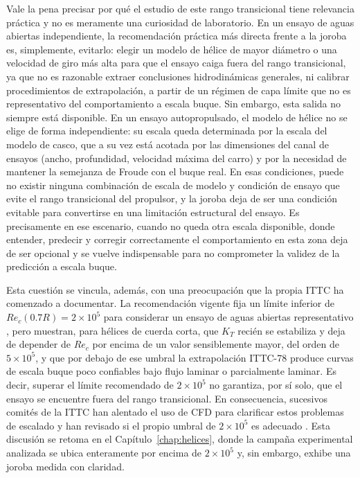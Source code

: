 Vale la pena precisar por qué el estudio de este rango transicional tiene relevancia
práctica y no es meramente una curiosidad de laboratorio. En un ensayo de aguas
abiertas independiente, la recomendación práctica más directa frente a la joroba es,
simplemente, evitarlo: elegir un modelo de hélice de mayor diámetro o una velocidad
de giro más alta para que el ensayo caiga fuera del rango transicional, ya que no es
razonable extraer conclusiones hidrodinámicas generales, ni calibrar procedimientos
de extrapolación, a partir de un régimen de capa límite que no es representativo del
comportamiento a escala buque. Sin embargo, esta salida no siempre está disponible.
En un ensayo autopropulsado, el modelo de hélice no se elige de forma independiente:
su escala queda determinada por la escala del modelo de casco, que a su vez está
acotada por las dimensiones del canal de ensayos (ancho, profundidad, velocidad
máxima del carro) y por la necesidad de mantener la semejanza de Froude con el buque
real. En esas condiciones, puede no existir ninguna combinación de escala de modelo y
condición de ensayo que evite el rango transicional del propulsor, y la joroba deja
de ser una condición evitable para convertirse en una limitación estructural del
ensayo. Es precisamente en ese escenario, cuando no queda otra escala disponible,
donde entender, predecir y corregir correctamente el comportamiento en esta zona deja
de ser opcional y se vuelve indispensable para no comprometer la validez de la
predicción a escala buque.
 
Esta cuestión se vincula, además, con una preocupación que la propia ITTC ha comenzado a documentar. La recomendación vigente fija un límite inferior de $Re_c(0.7R) = 2\times10^5$ para considerar un ensayo de aguas abiertas representativo \citep{ITTC_Performance_prediction}, pero \citet{heinke2019} muestran, para hélices de cuerda corta, que $K_T$ recién se estabiliza y deja de depender de $Re_c$ por encima de un valor sensiblemente mayor, del orden de $5\times10^5$, y que por debajo de ese umbral la extrapolación ITTC-78 produce curvas de escala buque poco confiables bajo flujo laminar o parcialmente laminar. Es decir, superar el límite recomendado de $2\times10^5$ no garantiza, por sí solo, que el ensayo se encuentre fuera del rango transicional. En consecuencia, sucesivos comités de la ITTC han alentado el uso de CFD para clarificar estos problemas de escalado y han revisado si el propio umbral de $2\times10^5$ es adecuado \citep{ittc2024rp}. Esta discusión se retoma en el Capítulo~\ref{chap:helices}, donde la campaña experimental analizada se ubica enteramente por encima de $2\times10^5$ y, sin embargo, exhibe una joroba medida con claridad.
 
